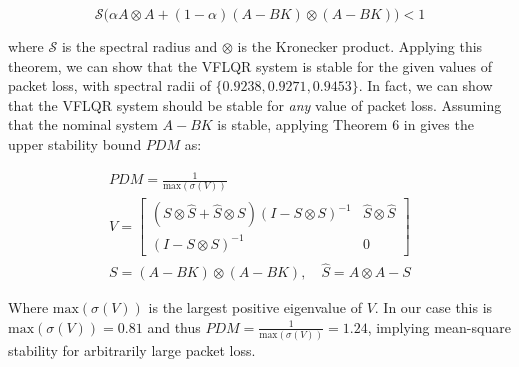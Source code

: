 \begin{equation}\label{eq:HuStabCondition}
	\mathcal{S}\Big(\alpha A \otimes A + (1-\alpha)(A-BK) \otimes (A-BK) \Big) < 1
\end{equation}

where $\mathcal{S}$ is the spectral radius and $\otimes$ is the Kronecker product. Applying this theorem, we can show that the VFLQR system is stable for the given values of packet loss, with spectral radii of $\{0.9238,0.9271,0.9453\}$. In fact, we can show that the VFLQR system should be stable for \textit{any} value of packet loss. Assuming that the nominal system $A-BK$ is stable, applying Theorem 6 in \cite{Hu2007} gives the upper stability bound $PDM$ as: 

\begin{equation}\label{eq:VMatrix}
	\begin{gathered}
		PDM = \frac{1}{\text{max}(\sigma(V))} \\
		V = \begin{bmatrix} (S\otimes\hat{S}+\hat{S} \otimes S)(I - S\otimes S)^{-1} & \hat{S}\otimes\hat{S} \\ (I - S\otimes S)^{-1} & 0 \end{bmatrix} \\
		S = \left(A-BK\right) \otimes \left(A-BK\right), \quad \hat{S} = A \otimes A - S
	\end{gathered}
\end{equation}

Where $\text{max}(\sigma(V))$ is the largest positive eigenvalue of $V$. In our case this is $\text{max}(\sigma(V)) = 0.81$ and thus $PDM = \frac{1}{\text{max}(\sigma(V))} = 1.24$, implying mean-square stability for arbitrarily large packet loss.




